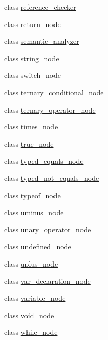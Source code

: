 \begin{DoxyCompactItemize}
class \hyperlink{classjawe_1_1reference__checker}{reference\+\_\+checker}
\item 
class \hyperlink{classjawe_1_1return__node}{return\+\_\+node}
\item 
class \hyperlink{classjawe_1_1semantic__analyzer}{semantic\+\_\+analyzer}
\item 
class \hyperlink{classjawe_1_1string__node}{string\+\_\+node}
\item 
class \hyperlink{classjawe_1_1switch__node}{switch\+\_\+node}
\item 
class \hyperlink{classjawe_1_1ternary__conditional__node}{ternary\+\_\+conditional\+\_\+node}
\item 
class \hyperlink{classjawe_1_1ternary__operator__node}{ternary\+\_\+operator\+\_\+node}
\item 
class \hyperlink{classjawe_1_1times__node}{times\+\_\+node}
\item 
class \hyperlink{classjawe_1_1true__node}{true\+\_\+node}
\item 
class \hyperlink{classjawe_1_1typed__equals__node}{typed\+\_\+equals\+\_\+node}
\item 
class \hyperlink{classjawe_1_1typed__not__equals__node}{typed\+\_\+not\+\_\+equals\+\_\+node}
\item 
class \hyperlink{classjawe_1_1typeof__node}{typeof\+\_\+node}
\item 
class \hyperlink{classjawe_1_1uminus__node}{uminus\+\_\+node}
\item 
class \hyperlink{classjawe_1_1unary__operator__node}{unary\+\_\+operator\+\_\+node}
\item 
class \hyperlink{classjawe_1_1undefined__node}{undefined\+\_\+node}
\item 
class \hyperlink{classjawe_1_1uplus__node}{uplus\+\_\+node}
\item 
class \hyperlink{classjawe_1_1var__declaration__node}{var\+\_\+declaration\+\_\+node}
\item 
class \hyperlink{classjawe_1_1variable__node}{variable\+\_\+node}
\item 
class \hyperlink{classjawe_1_1void__node}{void\+\_\+node}
\item 
class \hyperlink{classjawe_1_1while__node}{while\+\_\+node}
\end{DoxyCompactItemize}
